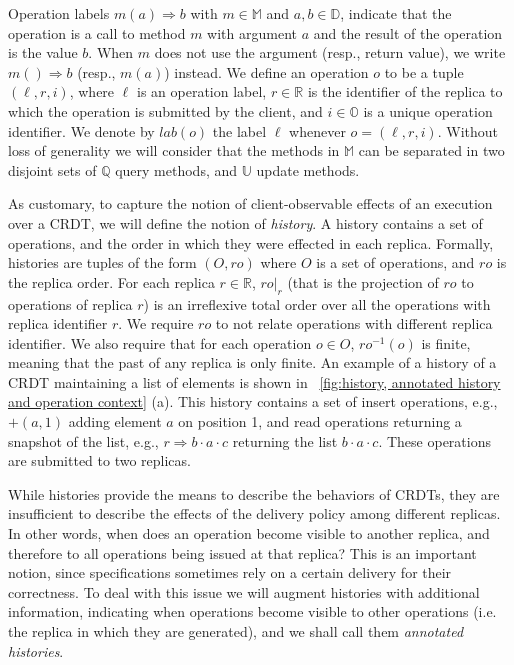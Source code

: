 Operation labels \mbox{$m(a)\Rightarrow b$} with $m \in \mathbb{M}$ and $a,b \in
\mathbb{D}$, indicate that the operation is a call to method $m$
with argument $a$ and the result of the operation is the value
$b$.
When $m$ does not use the argument (resp., return value), we write
$m()\Rightarrow b$ (resp., $m(a)$) instead.
We define an operation $o$ to be a tuple $(\ell,r,i)$, where $\ell$ is
an operation label, $r \in \mathbb{R}$ is the identifier of the
replica to which the operation is submitted by the client, and $i \in \mathbb{O}$ is a
unique operation identifier.
We denote by $\mathit{lab}(o)$ the label $\ell$ whenever $o = (\ell,
r, i)$.
%
Without loss of generality we will consider that the methods in
$\mathbb{M}$ can be separated in two disjoint sets of $\mathbb{Q}$
query methods, and $\mathbb{U}$ update methods.

As customary, to capture the notion of client-observable effects of an
execution over a CRDT, we will define the notion of \emph{history}.
%
A history contains a set of operations, and the order in which
they were effected in each replica.
% 
Formally, histories are tuples of the form $(O,\mathit{ro})$ where $O$ is a set of
operations, and $\mathit{ro}$ is the replica order. 
%
For each replica $r \in \mathbb{R}$, $\mathit{ro}|_{r}$ (that is the
projection of $ro$ to operations of replica $r$) is an irreflexive
total order over all the operations with replica identifier $r$.
%
We require $\mathit{ro}$ to not relate operations with different replica identifier. 
%
We also require that for each operation $o \in O$,
$\mathit{ro}^{-1}(o)$ is finite, meaning that the past of any replica
is only finite.
An example of a history of a CRDT maintaining a list of elements is shown in 
\figurename~\ref{fig:history, annotated history and operation context} (a).
This history contains a set of insert operations, e.g., $+(a,1)$ adding element $a$
on position 1, and read operations returning a snapshot of the list, e.g., $r\Rightarrow b\cdot a \cdot c$ 
returning the list $b\cdot a \cdot c$. These operations are submitted to two replicas.

While histories provide the means to describe the behaviors of CRDTs,
they are insufficient to describe the effects of the delivery
policy among different replicas.
%
In other words, when does an operation become visible to another
replica, and therefore to all operations being issued at that replica?
%
This is an important notion, since specifications sometimes rely on a
certain delivery for their correctness.
%
To deal with this issue we will augment histories with additional
information, indicating when operations become visible to other
operations (i.e. the replica in which they are generated), and we
shall call them \emph{annotated histories}.
%

